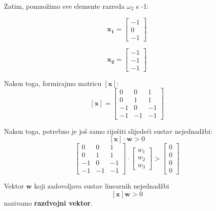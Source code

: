 \documentclass{book}
\begin{document}
\begin{shaded}
Zatim, pomnožimo sve elemente razreda $\omega_2$ s -1:
\begin{figure}[H]
\begin{minipage}[b]{0.5\textwidth}
$$ \mathbf{x_1} = \begin{bmatrix}
-1 \\
0 \\
-1
\end{bmatrix} $$

\end{minipage}
\begin{minipage}[b]{0.5\textwidth}
$$ \mathbf{x_2} = \begin{bmatrix}
-1 \\
-1 \\
-1
\end{bmatrix}$$
\end{minipage}
\end{figure}

Nakon toga, formirajmo matricu $[ \mathbf{x} ]$:
$$ [ \mathbf{x} ] = \begin{bmatrix}
0 & 0 & 1 \\
0 & 1 & 1 \\
-1 & 0 & -1 \\
-1 & -1 & -1
\end{bmatrix} $$

Nakon toga, potrebno je još samo riješiti slijedeći sustav nejednadžbi:
$$ [ \mathbf{x} ] \cdot \mathbf{w} > 0 $$
$$ \begin{bmatrix}
0 & 0 & 1 \\
0 & 1 & 1 \\
-1 & 0 & -1 \\
-1 & -1 & -1
\end{bmatrix} \cdot \begin{bmatrix}
w_1 \\
w_2 \\
w_3
\end{bmatrix} > \begin{bmatrix}
0 \\
0 \\
0 \\
0
\end{bmatrix} $$

\end{shaded}


 Vektor
$\mathbf{w}$ koji zadovoljava sustav linearnih nejednadžbi
$$[\mathbf{x}]\mathbf{w} > 0 $$ nazivamo \textbf{razdvojni vektor}.

 
\end{document}
